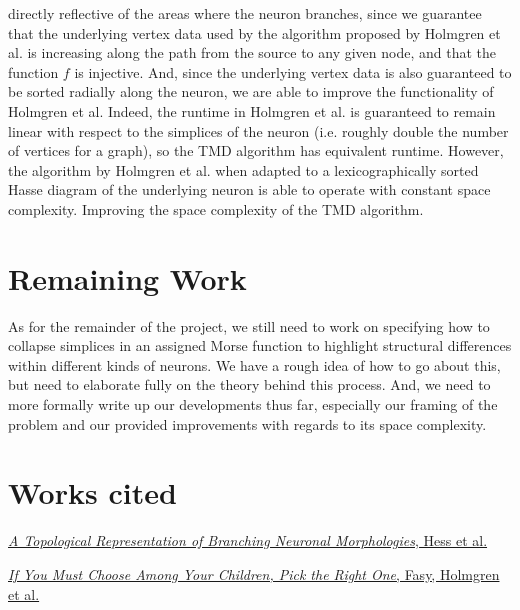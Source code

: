 \documentclass[11pt]{article}
\begin{document}
\begin{enumerate}
		directly reflective of the areas where the neuron branches, since we guarantee that the underlying vertex data
		used by the algorithm proposed by Holmgren et al. is increasing along the path from the source to any given node, and that the function
		$f$ is injective. And, since the underlying vertex data is also guaranteed to be sorted radially along the neuron, we are able
		to improve the functionality of Holmgren et al. Indeed, the runtime in Holmgren et al. is guaranteed to remain linear with respect
		to the simplices of the neuron (i.e. roughly double the number of vertices for a graph), so the TMD algorithm has equivalent runtime.
		However, the algorithm by Holmgren et al. when adapted to a lexicographically sorted Hasse diagram of the underlying neuron
		is able to operate with constant space complexity. Improving the space complexity of the TMD algorithm.
\end{enumerate}

\section*{Remaining Work}
As for the remainder of the project, we still need to work on specifying how to collapse simplices in an assigned Morse function to highlight
structural differences within different kinds of neurons. We have a rough idea of how to go about this, but need to elaborate fully on
the theory behind this process. And, we need to more formally write up our developments thus far, especially our framing of the problem
and our provided improvements with regards to its space complexity.

\section*{Works cited}
\href{hess.pdf}{\textit{A Topological Representation of Branching Neuronal Morphologies}, Hess et al.}

\href{cccg20.pdf}{\textit{If You Must Choose Among Your Children, Pick the Right One}, Fasy, Holmgren et al.}
\end{document}
